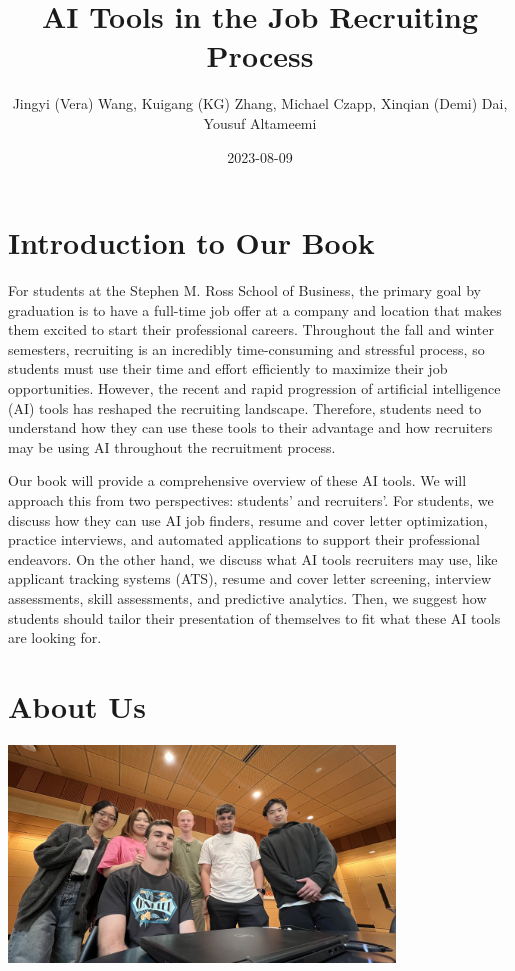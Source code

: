 \documentclass[
]{book}
\title{AI Tools in the Job Recruiting Process}
\author{Jingyi (Vera) Wang, Kuigang (KG) Zhang, Michael Czapp, Xinqian (Demi) Dai, Yousuf Altameemi}
\date{2023-08-09}
\begin{document}
\maketitle

{
\setcounter{tocdepth}{1}
\tableofcontents
}
\hypertarget{introduction-to-our-book}{%
\chapter{Introduction to Our Book}\label{introduction-to-our-book}}

For students at the Stephen M. Ross School of Business, the primary goal by graduation is to have a full-time job offer at a company and location that makes them excited to start their professional careers. Throughout the fall and winter semesters, recruiting is an incredibly time-consuming and stressful process, so students must use their time and effort efficiently to maximize their job opportunities. However, the recent and rapid progression of artificial intelligence (AI) tools has reshaped the recruiting landscape. Therefore, students need to understand how they can use these tools to their advantage and how recruiters may be using AI throughout the recruitment process.

Our book will provide a comprehensive overview of these AI tools. We will approach this from two perspectives: students' and recruiters'. For students, we discuss how they can use AI job finders, resume and cover letter optimization, practice interviews, and automated applications to support their professional endeavors. On the other hand, we discuss what AI tools recruiters may use, like applicant tracking systems (ATS), resume and cover letter screening, interview assessments, skill assessments, and predictive analytics. Then, we suggest how students should tailor their presentation of themselves to fit what these AI tools are looking for.

\hypertarget{about-us}{%
\chapter{About Us}\label{about-us}}

\includegraphics[width=4.04167in,height=\textheight]{Team Photo.jpg}
\end{document}
